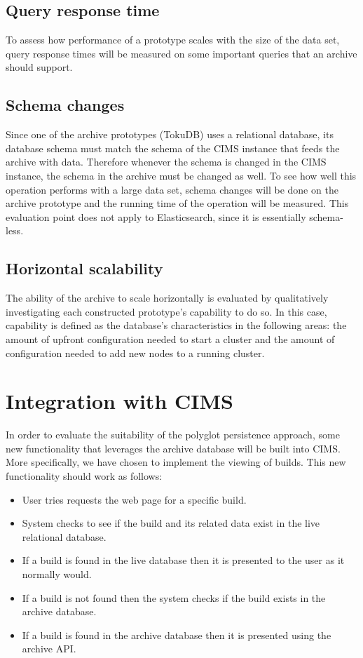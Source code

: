 \subsection{Query response time}
To assess how performance of a prototype scales with the size of the data set, query response times will be measured on some important queries that an archive should support.

\subsection{Schema changes}
Since one of the archive prototypes (TokuDB) uses a relational database, its database schema must match the schema of the CIMS instance that feeds the archive with data. Therefore whenever the schema is changed in the CIMS instance, the schema in the archive must be changed as well. To see how well this operation performs with a large data set, schema changes will be done on the archive prototype and the running time of the operation will be measured. This evaluation point does not apply to Elasticsearch, since it is essentially schema-less.

\subsection{Horizontal scalability}
The ability of the archive to scale horizontally is evaluated by qualitatively investigating each constructed prototype's capability to do so. In this case, capability is defined as the database's characteristics in the following areas: the amount of upfront configuration needed to start a cluster and the amount of configuration needed to add new nodes to a running cluster.

\section{Integration with CIMS}
In order to evaluate the suitability of the polyglot persistence approach, some new functionality that leverages the archive database will be built into CIMS. More specifically, we have chosen to implement the viewing of builds. This new functionality should work as follows:
\begin{itemize}
    \item User tries requests the web page for a specific build.
    \item System checks to see if the build and its related data exist in the live relational database.
    \item If a build is found in the live database then it is presented to the user as it normally would.
    \item If a build is not found then the system checks if the build exists in the archive database. 
    \item If a build is found in the archive database then it is presented using the archive API. 
\end{itemize}

